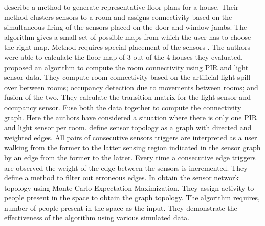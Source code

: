 \citeauthor{Lu:2014:SBS:2648771.2629441}\cite{Lu:2014:SBS:2648771.2629441} describe a method to generate representative floor plans for a house. Their method clusters sensors to a room and assigns connectivity based on the simultaneous firing of the sensors placed on the door and window jambs. The algorithm gives a small set of possible maps from which the user has to choose the right map. Method requires special placement of the sensors . The authors were able to calculate the floor map of 3 out of the 4 houses they evaluated.  
 \citeauthor{ellis2012creating}\cite{ellis2012creating} proposed an algorithm to compute the room connectivity using  PIR and light sensor data. They compute room connectivity based on the artificial light spill over between rooms; occupancy detection due to movements between
  rooms; and fusion of the two. They calculate the transition matrix for the light sensor and occupancy sensor. Fuse both the data together to compute the connectivity graph. Here the authors have considered a situation where there is only one PIR and light sensor per room.
\citeauthor{muller2014automated} define  sensor topology as a graph with directed and weighted edges. All pairs of consecutive sensors triggers are interpreted as a user walking from the former to the latter sensing region indicated in the sensor 
graph by an edge from the former to the latter. Every time a consecutive edge triggers are observed the weight of the edge between the sensors is incremented. They define a method to filter out erroneous edges.
In \cite{marinakis2005learning} \citeauthor{marinakis2005learning} obtain the sensor network topology using Monte Carlo Expectation Maximization. They assign activity to people present in the space to obtain the graph topology. The algorithm requires, number of people present in the space as the input. They demonstrate the effectiveness of the algorithm using various simulated data. 




